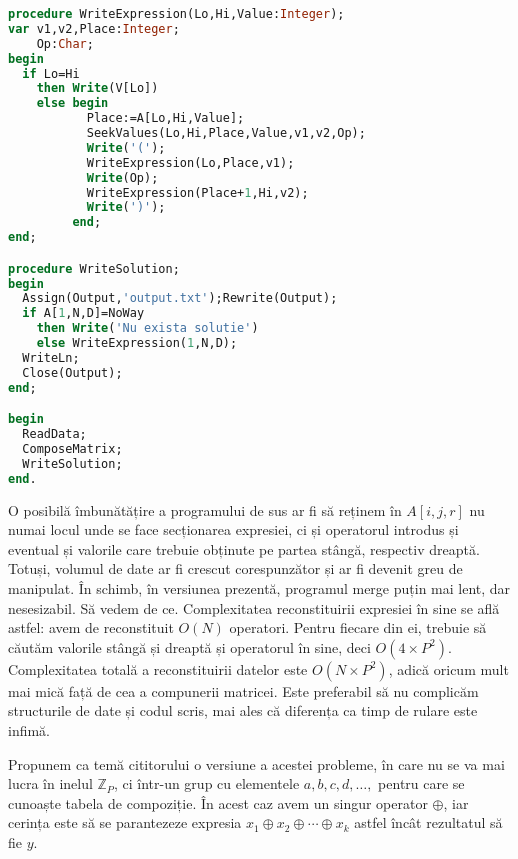 \begin{lstlisting}[language=Pascal]
procedure WriteExpression(Lo,Hi,Value:Integer);
var v1,v2,Place:Integer;
    Op:Char;
begin
  if Lo=Hi
    then Write(V[Lo])
    else begin
           Place:=A[Lo,Hi,Value];
           SeekValues(Lo,Hi,Place,Value,v1,v2,Op);
           Write('(');
           WriteExpression(Lo,Place,v1);
           Write(Op);
           WriteExpression(Place+1,Hi,v2);
           Write(')');
         end;
end;

procedure WriteSolution;
begin
  Assign(Output,'output.txt');Rewrite(Output);
  if A[1,N,D]=NoWay
    then Write('Nu exista solutie')
    else WriteExpression(1,N,D);
  WriteLn;
  Close(Output);
end;

begin
  ReadData;
  ComposeMatrix;
  WriteSolution;
end.
\end{lstlisting}

O posibilă îmbunătățire a programului de sus ar fi să reținem în $A[i,j,r]$ nu
numai locul unde se face secționarea expresiei, ci și operatorul introdus și
eventual și valorile care trebuie obținute pe partea stângă, respectiv
dreaptă. Totuși, volumul de date ar fi crescut corespunzător și ar fi devenit
greu de manipulat. În schimb, în versiunea prezentă, programul merge puțin mai
lent, dar nesesizabil. Să vedem de ce. Complexitatea reconstituirii expresiei
în sine se află astfel: avem de reconstituit $O(N)$ operatori. Pentru fiecare
din ei, trebuie să căutăm valorile stângă și dreaptă și operatorul în sine,
deci $O(4 \times P^2)$. Complexitatea totală a reconstituirii datelor este
$O(N \times P^2)$, adică oricum mult mai mică față de cea a compunerii
matricei. Este preferabil să nu complicăm structurile de date și codul scris,
mai ales că diferența ca timp de rulare este infimă.

Propunem ca temă cititorului o versiune a acestei probleme, în care nu se va
mai lucra în inelul $\mathbb{Z}_P$, ci într-un grup cu elementele $a, b, c, d,
\dots,$ pentru care se cunoaște tabela de compoziție. În acest caz avem un
singur operator $\oplus$, iar cerința este să se parantezeze expresia $x_1
\oplus x_2 \oplus \cdots \oplus x_k$ astfel încât rezultatul să fie $y$.
